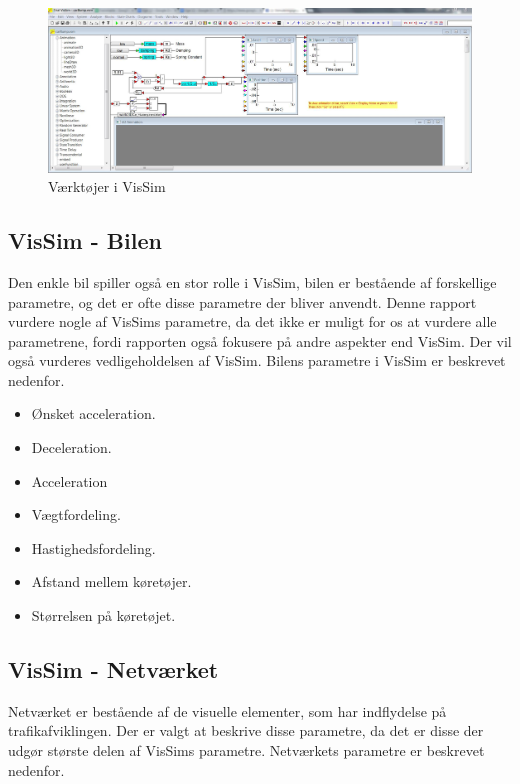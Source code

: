 \begin{figure}
\begin{center}
\includegraphics[width=1.2\textwidth]{Pictures/Teknologianalyse/vissimfunker.jpg}
\end{center}
\caption{Værktøjer i VisSim}
\label{vissim}
\end{figure}

\subsection{VisSim - Bilen}
Den enkle bil spiller også en stor rolle i VisSim, bilen er bestående af forskellige parametre, og det er ofte disse parametre der bliver anvendt. Denne rapport vurdere nogle af VisSims parametre, da det ikke er muligt for os at vurdere alle parametrene, fordi rapporten også fokusere på andre aspekter end VisSim. Der vil også vurderes vedligeholdelsen af VisSim. Bilens parametre i VisSim er beskrevet nedenfor.

\begin{itemize}
\item Ønsket acceleration.
\item Deceleration.
\item Acceleration
\item Vægtfordeling.
\item Hastighedsfordeling.
\item Afstand mellem køretøjer.
\item Størrelsen på køretøjet.
\end{itemize}

\subsection{VisSim - Netværket}
Netværket er bestående af de visuelle elementer, som har indflydelse på trafikafviklingen. Der er valgt at beskrive disse parametre, da det er disse der udgør største delen af VisSims parametre.
Netværkets parametre er beskrevet nedenfor.

